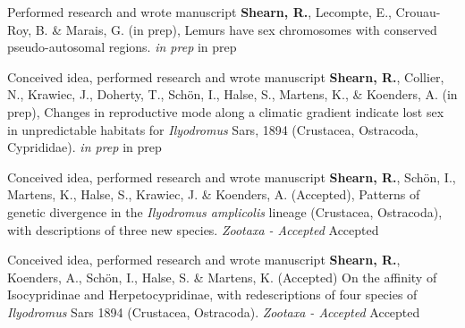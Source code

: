 

\begin{cvpubs}
	
  \cvpub
	{Performed research and wrote manuscript} %
	{\textbf{Shearn, R.}, Lecompte, E., Crouau-Roy, B. \& Marais, G. (in prep), Lemurs have sex chromosomes with conserved pseudo-autosomal regions. \emph{in prep}} %
	{in prep} %
	
  \cvpub
	{Conceived idea, performed research and wrote manuscript} %
	{\textbf{Shearn, R.}, Collier, N., Krawiec, J., Doherty, T., Schön, I., Halse, S., Martens, K., \& Koenders, A. (in prep), Changes in reproductive mode along a climatic gradient indicate lost sex in unpredictable habitats for \textit{Ilyodromus} Sars, 1894 (Crustacea, Ostracoda, Cyprididae). \emph{in prep}} %
	{in prep} %
	
  \cvpub
	{Conceived idea, performed research and wrote manuscript} %
	{\textbf{Shearn, R.}, Schön, I., Martens, K., Halse, S., Krawiec, J. \& Koenders, A. (Accepted), Patterns of genetic divergence in the \textit{Ilyodromus amplicolis} lineage (Crustacea, Ostracoda), with descriptions of three new species. \emph{Zootaxa - Accepted}} %
	{Accepted} %
	
  \cvpub
	{Conceived idea, performed research and wrote manuscript} %
	{\textbf{Shearn, R.}, Koenders, A., Schön, I., Halse, S. \& Martens, K. (Accepted) On the affinity of Isocypridinae and Herpetocypridinae, with redescriptions of four species of \textit{Ilyodromus} Sars 1894 (Crustacea, Ostracoda). \emph{Zootaxa - Accepted}} %
	{Accepted} %
	

\end{cvpubs}
